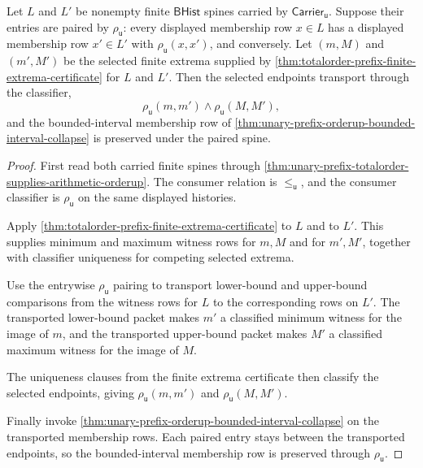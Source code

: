 \begin{theorem}
\label{thm:unary-prefix-orderup-interval-transport}
Let $L$ and $L'$ be nonempty finite $\mathsf{BHist}$ spines carried by
$\mathsf{Carrier}_{\mathsf{u}}$. Suppose their entries are paired by
$\rho_{\mathsf{u}}$: every displayed membership row $x\in L$ has a displayed
membership row $x'\in L'$ with $\rho_{\mathsf{u}}(x,x')$, and conversely.
Let $(m,M)$ and $(m',M')$ be the selected finite extrema supplied by
\autoref{thm:totalorder-prefix-finite-extrema-certificate} for $L$ and $L'$.
Then the selected endpoints transport through the classifier,
$$
\rho_{\mathsf{u}}(m,m')
\land
\rho_{\mathsf{u}}(M,M'),
$$
and the bounded-interval membership row of
\autoref{thm:unary-prefix-orderup-bounded-interval-collapse} is preserved
under the paired spine.
\end{theorem}
\begin{proof}
First read both carried finite spines through
\autoref{thm:unary-prefix-totalorder-supplies-arithmetic-orderup}. The
consumer relation is $\le_{\mathsf{u}}$, and the consumer classifier is
$\rho_{\mathsf{u}}$ on the same displayed histories.

Apply \autoref{thm:totalorder-prefix-finite-extrema-certificate} to $L$ and
to $L'$. This supplies minimum and maximum witness rows for $m,M$ and for
$m',M'$, together with classifier uniqueness for competing selected extrema.

Use the entrywise $\rho_{\mathsf{u}}$ pairing to transport lower-bound and
upper-bound comparisons from the witness rows for $L$ to the corresponding
rows on $L'$. The transported lower-bound packet makes $m'$ a classified
minimum witness for the image of $m$, and the transported upper-bound packet
makes $M'$ a classified maximum witness for the image of $M$.

The uniqueness clauses from the finite extrema certificate then classify the
selected endpoints, giving $\rho_{\mathsf{u}}(m,m')$ and
$\rho_{\mathsf{u}}(M,M')$.

Finally invoke \autoref{thm:unary-prefix-orderup-bounded-interval-collapse}
on the transported membership rows. Each paired entry stays between the
transported endpoints, so the bounded-interval membership row is preserved
through $\rho_{\mathsf{u}}$.
\end{proof}

